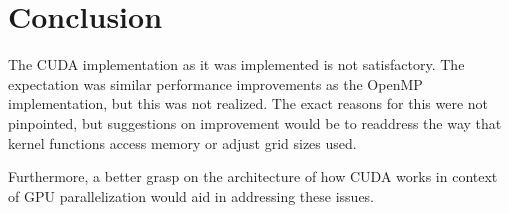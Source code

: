 \documentclass{article}
\begin{document}
  \section{Conclusion}

  The CUDA implementation as it was implemented is not satisfactory. The
  expectation was similar performance improvements as the OpenMP 
  implementation, but this was not realized. The exact reasons for this were
  not pinpointed, but suggestions on improvement would be to readdress the way 
  that kernel functions access memory or adjust grid sizes used.
  
  Furthermore, a better grasp on the architecture of how CUDA works in context
  of GPU parallelization would aid in addressing these issues.
\end{document}
